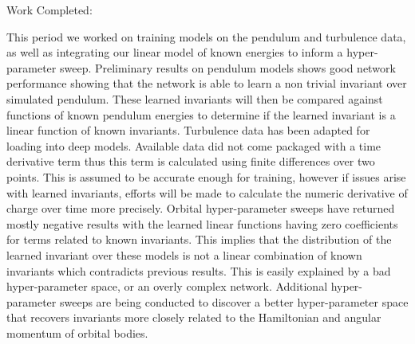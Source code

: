 \documentclass[10pt,letterpaper]{report}
\author{Brandon Houghton}
\begin{document}
	
	Work Completed:
	
	This period we worked on training models on the pendulum and turbulence data, as well as integrating our linear model of known energies to inform a hyper-parameter sweep. 
	Preliminary results on pendulum models shows good network performance showing that the network is able to learn a non trivial invariant over simulated pendulum. These learned invariants will then be compared against functions of known pendulum energies to determine if the learned invariant is a linear function of known invariants. 
	Turbulence data has been adapted for loading into deep models. Available data did not come packaged with a time derivative term thus this term is calculated using finite differences over two points. This is assumed to be accurate enough for training, however if issues arise with learned invariants, efforts will be made to calculate the numeric derivative of charge over time more precisely.
	Orbital hyper-parameter sweeps have returned mostly negative results with the learned linear functions having zero coefficients for terms related to known invariants. This implies that the distribution of the learned invariant over these models is not a linear combination of known invariants which contradicts previous results. This is easily explained by a bad hyper-parameter space, or an overly complex network. Additional hyper-parameter sweeps are being conducted to discover a better hyper-parameter space that recovers invariants more closely related to the Hamiltonian and angular momentum of orbital bodies.
	
	
	
\end{document}
